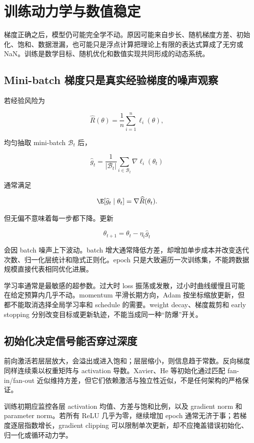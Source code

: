 \section{训练动力学与数值稳定}

梯度正确之后，模型仍可能完全学不动。原因可能来自步长、随机梯度方差、初始化、饱和、数据泄漏，也可能只是浮点计算把理论上有限的表达式算成了无穷或 NaN。训练是数学目标、随机优化和数值实现共同形成的动态系统。

\subsection{Mini-batch 梯度只是真实经验梯度的噪声观察}

若经验风险为

\[
\widehat R(\theta)
=\frac1n\sum_{i=1}^n\ell_i(\theta),
\]

均匀抽取 mini-batch \(\mathcal B_t\) 后，

\[
\widehat g_t
=\frac1{|\mathcal B_t|}
\sum_{i\in\mathcal B_t}\nabla\ell_i(\theta_t)
\]

通常满足

\[
\E[\widehat g_t\mid\theta_t]
=\nabla\widehat R(\theta_t).
\]

但无偏不意味着每一步都下降。更新

\[
\theta_{t+1}
=\theta_t-\eta_t\widehat g_t
\]

会因 batch 噪声上下波动。batch 增大通常降低方差，却增加单步成本并改变迭代次数、归一化层统计和隐式正则化。epoch 只是大致遍历一次训练集，不能跨数据规模直接代表相同优化进展。

学习率通常是最敏感的超参数。过大时 loss 振荡或发散，过小时曲线缓慢且可能在给定预算内几乎不动。momentum 平滑长期方向，Adam 按坐标缩放更新，但都不能取消选择全局学习率和 schedule 的需要。weight decay、梯度裁剪和 early stopping 分别改变目标或更新轨迹，不能当成同一种``防爆''开关。

\subsection{初始化决定信号能否穿过深度}

前向激活若层层放大，会溢出或进入饱和；层层缩小，则信息趋于常数。反向梯度同样连续乘以权重矩阵与 activation 导数。Xavier、He 等初始化通过匹配 fan-in/fan-out 近似维持方差，但它们依赖激活与独立性近似，不是任何架构的严格保证。

训练初期应监控各层 activation 均值、方差与饱和比例，以及 gradient norm 和 parameter norm。若所有 ReLU 几乎为零，继续增加 epoch 通常无济于事；若梯度逐层指数增长，gradient clipping 可以限制单次更新，却不应掩盖错误初始化、归一化或循环动力学。

